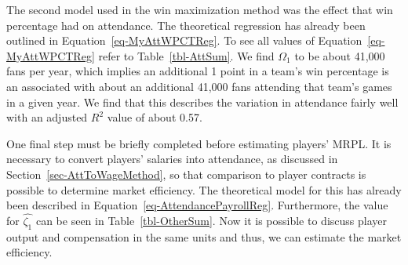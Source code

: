 \documentclass[
  12pt,
  letterpaper,
  DIV=11,
  numbers=noendperiod]{scrartcl}
\begin{document}
The second model used in the win maximization method was the effect that
win percentage had on attendance. The theoretical regression has already
been outlined in Equation~\ref{eq-MyAttWPCTReg}. To see all values of
Equation~\ref{eq-MyAttWPCTReg} refer to Table~\ref{tbl-AttSum}. We find
\(\Omega_1\) to be about 41,000 fans per year, which implies an
additional 1 point in a team's win percentage is an associated with
about an additional 41,000 fans attending that team's games in a given
year. We find that this describes the variation in attendance fairly
well with an adjusted \(R^2\) value of about 0.57.

One final step must be briefly completed before estimating players'
MRPL. It is necessary to convert players' salaries into attendance, as
discussed in Section~\ref{sec-AttToWageMethod}, so that comparison to
player contracts is possible to determine market efficiency. The
theoretical model for this has already been described in
Equation~\ref{eq-AttendancePayrollReg}. Furthermore, the value for
\(\widehat{\zeta_1}\) can be seen in Table~\ref{tbl-OtherSum}. Now it is
possible to discuss player output and compensation in the same units and
thus, we can estimate the market efficiency.
\end{document}
